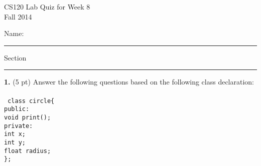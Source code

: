 \documentclass[12pt,openbib]{article}
\begin{document}
\thispagestyle{empty}
\vspace{-1.0in}
\Large
\begin{center}
\textsf{CS120  Lab Quiz for Week 8}\\
\large
\textsf{Fall 2014}
\end{center}
\vspace{-0.2in}
\large\textsf{Name: }\rule[-0.01in]{2.5in}{0.015in}
\hspace{0.5in} Section \rule[-0.01in]{1.0in}{0.015in}

\normalsize
\rm

{\bf 1.} (5 pt)  Answer the following questions based on the following class declaration:\\ \\
{\tt 
class circle\{ \\
\hspace*{0.2in}public:\\
\hspace*{0.5in}void print();\\
\hspace*{0.2in}private:\\
\hspace*{0.5in}int x; \\
\hspace*{0.5in}int y; \\
\hspace*{0.5in}float radius; \\
\};
}
\end{document}
